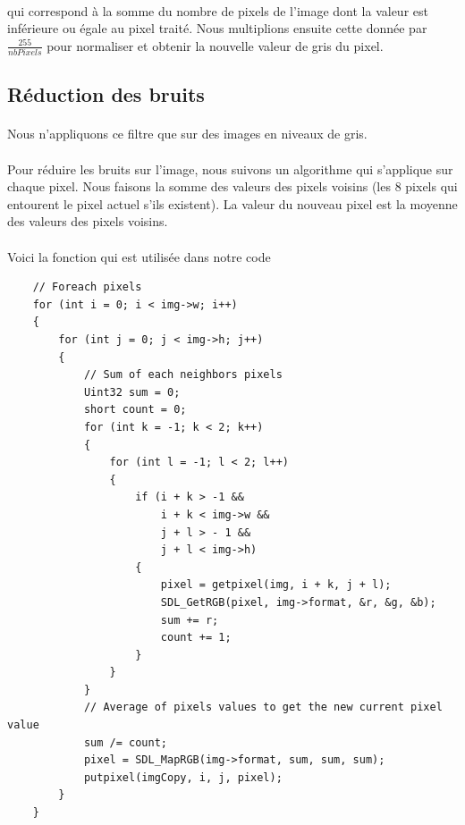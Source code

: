 \documentclass{article}
\begin{document}
\paragraph{}qui correspond à la somme du nombre de pixels de l'image dont la valeur est inférieure ou égale au pixel traité. Nous multiplions ensuite cette donnée par $\frac{255}{nbPixels}$ pour normaliser et obtenir la nouvelle valeur de gris du pixel.


\subsection{Réduction des bruits}

\paragraph{}Nous n'appliquons ce filtre que sur des images en niveaux de gris.

\paragraph{}Pour réduire les bruits sur l'image, nous suivons un algorithme qui s'applique sur chaque pixel. Nous faisons la somme des valeurs des pixels voisins (les 8 pixels qui entourent le pixel actuel s'ils existent). La valeur du nouveau pixel est la moyenne des valeurs des pixels voisins.

\paragraph{}Voici la fonction qui est utilisée dans notre code

\begin{lstlisting}
	// Foreach pixels
    for (int i = 0; i < img->w; i++)
    {
        for (int j = 0; j < img->h; j++)
        {
            // Sum of each neighbors pixels
            Uint32 sum = 0;
            short count = 0;
            for (int k = -1; k < 2; k++)
            {
                for (int l = -1; l < 2; l++)
                {
                    if (i + k > -1 && 
                        i + k < img->w && 
                        j + l > - 1 && 
                        j + l < img->h) 
                    {
                        pixel = getpixel(img, i + k, j + l);
                        SDL_GetRGB(pixel, img->format, &r, &g, &b);
                        sum += r;
                        count += 1;
                    }
                }
            }
            // Average of pixels values to get the new current pixel value
            sum /= count;
            pixel = SDL_MapRGB(img->format, sum, sum, sum);
            putpixel(imgCopy, i, j, pixel);
        }
    }
\end{lstlisting}
\newpage
{}
\end{document}
